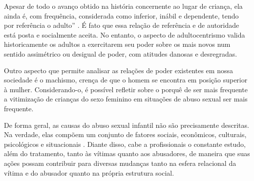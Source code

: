 Apesar de todo o avanço obtido na história concernente ao lugar de criança, ela ainda é, com frequência, considerada como inferior, inábil e dependente, tendo por referência o adulto'' \cite[p. 6]{JUNG2006}. É fato que essa relação de referência e de autoridade está posta e socialmente aceita. No entanto, o aspecto de adultocentrismo valida historicamente os adultos a exercitarem seu poder sobre os mais novos num sentido assimétrico ou desigual de poder, com atitudes danosas e desregradas. 

Outro aspecto que permite analisar as relações de poder existentes em nossa sociedade é o machismo, crença de que o homem se encontra em posição superior à mulher. Considerando-o, é possível refletir sobre o porquê de ser mais frequente  a vitimização de crianças do sexo feminino em situações de abuso sexual ser mais frequente.

De forma geral, as causas do abuso sexual infantil não são precisamente descritas. Na verdade, elas compõem um conjunto de fatores sociais, econômicos, culturais, psicológicos e situacionais \cite{JUNG2006}. Diante disso, cabe a profissionais o constante estudo, além do tratamento, tanto às vítimas quanto aos abusadores, de maneira que suas ações possam contribuir para diversas mudanças tanto na esfera relacional da vítima e do abusador quanto na própria estrutura social.